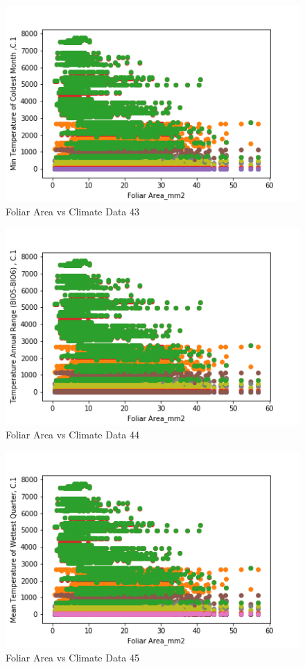 \documentclass[letterpaper]{article}
\begin{document}
\begin{figure}[h]
\caption{Foliar Area vs Climate Data 43\label{fig:Foliar_Area_vs_43}}
\centering
\includegraphics[width=0.7\paperwidth]{Foliar_Area_vs_43}
\end{figure}


\begin{figure}[h]
\caption{Foliar Area vs Climate Data 44\label{fig:Foliar_Area_vs_44}}
\centering
\includegraphics[width=0.7\paperwidth]{Foliar_Area_vs_44}
\end{figure}


\begin{figure}[h]
\caption{Foliar Area vs Climate Data 45\label{fig:Foliar_Area_vs_45}}
\centering
\includegraphics[width=0.7\paperwidth]{Foliar_Area_vs_45}
\end{figure}
\end{document}
